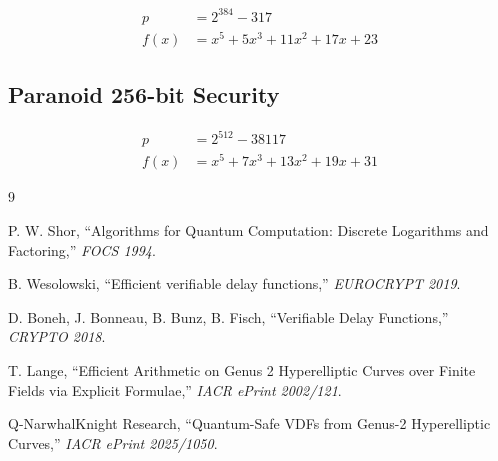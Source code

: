 \documentclass[11pt,a4paper]{article}
\begin{document}
\begin{align*}
p &= 2^{384} - 317 \\
f(x) &= x^5 + 5x^3 + 11x^2 + 17x + 23
\end{align*}

\subsection{Paranoid 256-bit Security}

\begin{align*}
p &= 2^{512} - 38117 \\
f(x) &= x^5 + 7x^3 + 13x^2 + 19x + 31
\end{align*}

\begin{thebibliography}{9}

P. W. Shor, ``Algorithms for Quantum Computation: Discrete Logarithms and Factoring,'' \textit{FOCS 1994}.

B. Wesolowski, ``Efficient verifiable delay functions,'' \textit{EUROCRYPT 2019}.

D. Boneh, J. Bonneau, B. Bunz, B. Fisch, ``Verifiable Delay Functions,'' \textit{CRYPTO 2018}.

T. Lange, ``Efficient Arithmetic on Genus 2 Hyperelliptic Curves over Finite Fields via Explicit Formulae,'' \textit{IACR ePrint 2002/121}.

Q-NarwhalKnight Research, ``Quantum-Safe VDFs from Genus-2 Hyperelliptic Curves,'' \textit{IACR ePrint 2025/1050}.

\end{thebibliography}
\end{document}
